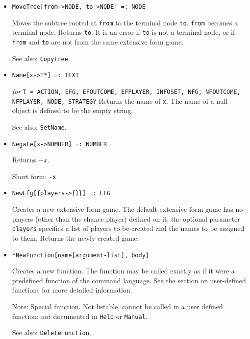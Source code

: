 \begin{itemize}
\item{}
\protect \large \begin{verbatim}
MoveTree[from->NODE, to->NODE] =: NODE 
\end{verbatim}\normalsize

\bd
Moves the subtree rooted at \verb+from+ to
the terminal node \verb+to+.  \verb+from+ becomes a terminal node.
Returns \verb+to+.  It is an error if \verb+to+ is not a terminal
node, or if \verb+from+ and \verb+to+ are not from the same extensive
form game.
\item [See also:] \verb+CopyTree+.
\ed


\item{}
\protect \large \begin{verbatim}
Name[x->T*] =: TEXT
\end{verbatim}\normalsize

{\it for} {\tt T = ACTION, EFG, EFOUTCOME, EFPLAYER, INFOSET,
NFG, NFOUTCOME, NFPLAYER, NODE, STRATEGY} 
\bd
Returns the name of \verb+x+.  The name of a null object is defined
to be the empty string.
\item
[See also:] \verb+SetName+.
\ed

\item{} 
\protect \large \begin{verbatim}
Negate[x->NUMBER] =: NUMBER 
\end{verbatim} \normalsize

\bd
Returns $-x$.
\item
[Short form:] \verb+-x+
\ed

\item{}
\protect \large \begin{verbatim} 
NewEfg[{players->{}}] =: EFG 
\end{verbatim}\normalsize

\bd
Creates a new extensive form game.  The default extensive form
game has no players (other than the chance player) defined on it; the
optional parameter \verb+players+ specifies a list of players to be
created and the names to be assigned to them.  Returns the newly created game.
\ed

\item{}   
\protect \large \begin{verbatim}
*NewFunction[name[argument-list], body]
\end{verbatim}\normalsize

\bd
Creates a new function.  The function may be called exactly
as if it were a predefined function of the command language.  See the
section on user-defined functions for more detailed information.
\item [Note:]  Special function.  Not listable, cannot be called in a
user defined function; not documented in \verb+Help+ or \verb+Manual+.  
\item [See also:] \verb+DeleteFunction+.
\ed


\end{itemize}
